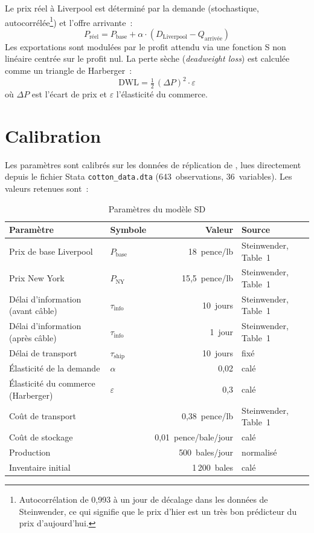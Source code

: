 Le prix réel à Liverpool est déterminé par la demande (stochastique, autocorrélée\footnote{Autocorrélation de 0,993 à un jour de décalage dans les données de Steinwender, ce qui signifie que le prix d'hier est un très bon prédicteur du prix d'aujourd'hui.}) et l'offre arrivante~:
%
\begin{equation}\label{eq:actual-price}
P_{\mathrm{réel}} = P_{\mathrm{base}} + \alpha \cdot (D_{\mathrm{Liverpool}} - Q_{\mathrm{arrivée}})
\end{equation}
%
Les exportations sont modulées par le profit attendu via une fonction S non linéaire centrée sur le profit nul. La perte sèche (\emph{deadweight loss}) est calculée comme un triangle de Harberger~:
%
\begin{equation}\label{eq:dwl}
\mathrm{DWL} = \tfrac{1}{2}\,(\Delta P)^2 \cdot \varepsilon
\end{equation}
%
où $\Delta P$ est l'écart de prix et $\varepsilon$ l'élasticité du commerce.


\section{Calibration}

Les paramètres sont calibrés sur les données de réplication de \textcite{steinwender_real_2018}, lues directement depuis le fichier Stata \texttt{cotton\_data.dta} (643~observations, 36~variables). Les valeurs retenues sont~:

\begin{table}[htbp]
\caption{Paramètres du modèle SD}\label{tab:sd-params}
\centering\small
\begin{tabular}{llrl}
\toprule
\textbf{Paramètre} & \textbf{Symbole} & \textbf{Valeur} & \textbf{Source} \\
\midrule
Prix de base Liverpool & $P_{\mathrm{base}}$ & 18~pence/lb & Steinwender, Table~1 \\
Prix New York & $P_{\mathrm{NY}}$ & 15,5~pence/lb & Steinwender, Table~1 \\
Délai d'information (avant câble) & $\tau_{\mathrm{info}}$ & 10~jours & Steinwender, Table~1 \\
Délai d'information (après câble) & $\tau_{\mathrm{info}}$ & 1~jour & Steinwender, Table~1 \\
Délai de transport & $\tau_{\mathrm{ship}}$ & 10~jours & fixé \\
Élasticité de la demande & $\alpha$ & 0,02 & calé \\
Élasticité du commerce (Harberger) & $\varepsilon$ & 0,3 & calé \\
Coût de transport & & 0,38~pence/lb & Steinwender, Table~1 \\
Coût de stockage & & 0,01~pence/bale/jour & calé \\
Production & & 500~bales/jour & normalisé \\
Inventaire initial & & 1\,200~bales & calé \\
\bottomrule
\end{tabular}
\end{table}


